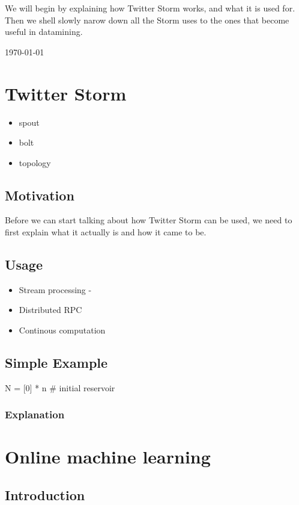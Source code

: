 \documentclass[journal]{IEEEtran/IEEEtran}
\begin{document}
We will begin by explaining how Twitter Storm works, and what it is used for. Then we shell slowly narow down all the Storm uses to the ones that become useful in datamining.

\hfill \today
\section{Twitter Storm}
\begin{itemize}
    \item spout
    \item bolt
    \item topology
\end{itemize}
\subsection{Motivation}
Before we can start talking about how Twitter Storm can be used, we need to first explain what it actually is and how it came to be.

\subsection{Usage}

\begin{itemize}
    \item Stream processing - 
    \item Distributed RPC
    \item Continous computation
\end{itemize}

\subsection{Simple Example}

\begin{code}
N = [0] * n # initial reservoir
\end{code}
\subsubsection*{Explanation}

\section{Online machine learning}

\subsection{Introduction}
\end{document}
